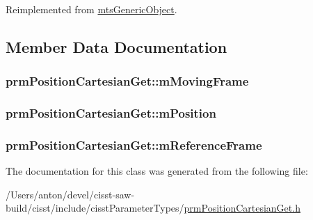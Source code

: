 Reimplemented from \hyperlink{classmts_generic_object_a4916a6c62ee5b167d7c93c88ab72523a}{mts\+Generic\+Object}.



\subsection{Member Data Documentation}
\hypertarget{classprm_position_cartesian_get_a01778edc80fb05f525a61afd47753631}{}
\subsubsection[{m\+Moving\+Frame}]{ prm\+Position\+Cartesian\+Get\+::m\+Moving\+Frame\hspace{0.3cm}{\ttfamily [protected]}}\label{classprm_position_cartesian_get_a01778edc80fb05f525a61afd47753631}
\hypertarget{classprm_position_cartesian_get_ac1033fd1dd058ef3976c5161a483fa92}{}
\subsubsection[{m\+Position}]{ prm\+Position\+Cartesian\+Get\+::m\+Position\hspace{0.3cm}{\ttfamily [protected]}}\label{classprm_position_cartesian_get_ac1033fd1dd058ef3976c5161a483fa92}
\hypertarget{classprm_position_cartesian_get_a64e672cde3d04a727f394fc97dc455ed}{}
\subsubsection[{m\+Reference\+Frame}]{ prm\+Position\+Cartesian\+Get\+::m\+Reference\+Frame\hspace{0.3cm}{\ttfamily [protected]}}\label{classprm_position_cartesian_get_a64e672cde3d04a727f394fc97dc455ed}


The documentation for this class was generated from the following file\+:\begin{DoxyCompactItemize}
\item 
/\+Users/anton/devel/cisst-\/saw-\/build/cisst/include/cisst\+Parameter\+Types/\hyperlink{prm_position_cartesian_get_8h}{prm\+Position\+Cartesian\+Get.\+h}\end{DoxyCompactItemize}
